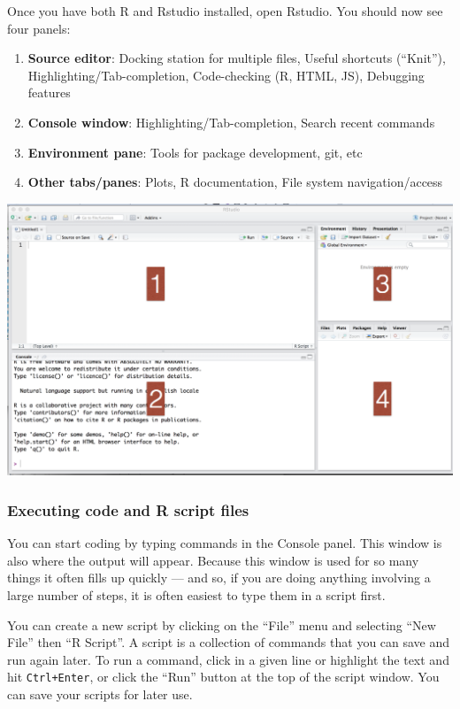 \documentclass[
]{book}
\providecommand{\tightlist}{%
  \setlength{\itemsep}{0pt}\setlength{\parskip}{0pt}}
\begin{document}
Once you have both R and Rstudio installed, open Rstudio. You should now see four panels:

\begin{enumerate}
\def\labelenumi{(\arabic{enumi})}
\tightlist
\item
  \textbf{Source editor}: Docking station for multiple files, Useful shortcuts (``Knit''), Highlighting/Tab-completion, Code-checking (R, HTML, JS), Debugging features
\item
  \textbf{Console window}: Highlighting/Tab-completion, Search recent commands
\item
  \textbf{Environment pane}: Tools for package development, git, etc
\item
  \textbf{Other tabs/panes}: Plots, R documentation, File system navigation/access
\end{enumerate}

\includegraphics{img/rstudio-panes.png}

\hypertarget{executing-code-and-r-script-files}{%
\subsubsection*{Executing code and R script files}\label{executing-code-and-r-script-files}}

You can start coding by typing commands in the Console panel. This window is also where the output will appear. Because this window is used for so many things it often fills up quickly --- and so, if you are doing anything involving a large number of steps, it is often easiest to type them in a script first.

You can create a new script by clicking on the ``File'' menu and selecting ``New File'' then ``R Script''. A script is a collection of commands that you can save and run again later. To run a command, click in a given line or highlight the text and hit \texttt{Ctrl+Enter}, or click the ``Run'' button at the top of the script window. You can save your scripts for later use.
\end{document}

